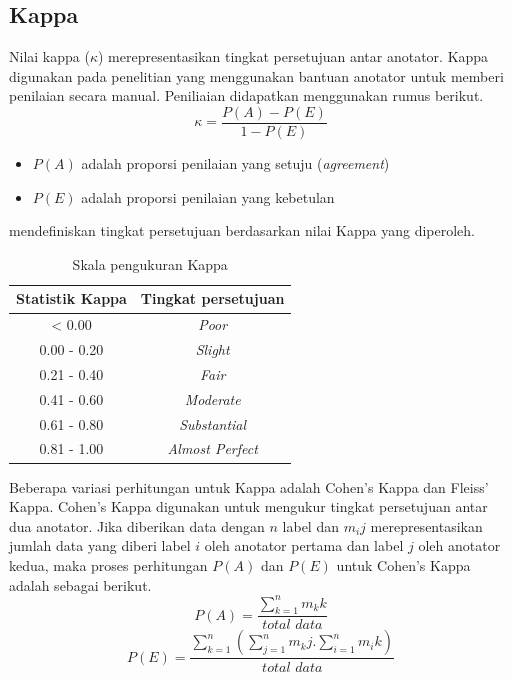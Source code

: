 \subsection{Kappa}
Nilai kappa ($\kappa$) merepresentasikan tingkat persetujuan antar anotator. Kappa digunakan pada penelitian yang menggunakan bantuan anotator untuk memberi penilaian secara manual. Peniliaian didapatkan menggunakan rumus berikut.
\[ \kappa=\frac{P(A)-P(E)}{1-P(E)} \]
\begin{itemize}
  \item $P(A)$ adalah proporsi penilaian yang setuju (\textit{agreement})
  \item $P(E)$ adalah proporsi penilaian yang kebetulan
\end{itemize}
\cite{landis1977measurement} mendefiniskan tingkat persetujuan berdasarkan nilai Kappa yang diperoleh. 
\begin{table}
  \centering
    \caption{Skala pengukuran Kappa}
    \label{table:skalaKappa}
    \begin{tabular}{|c|c|}
      \hline
      Statistik Kappa & Tingkat persetujuan \\ \hline
      < 0.00 & \textit{Poor} \\ \hline
      0.00 - 0.20 & \textit{Slight} \\ \hline
      0.21 - 0.40 & \textit{Fair} \\ \hline
      0.41 - 0.60 & \textit{Moderate} \\ \hline
      0.61 - 0.80 & \textit{Substantial} \\ \hline
      0.81 - 1.00 & \textit{Almost Perfect} \\ \hline
    \end{tabular}
\end{table}

Beberapa variasi perhitungan untuk Kappa adalah Cohen's Kappa dan Fleiss' Kappa. Cohen's Kappa digunakan untuk mengukur tingkat persetujuan antar dua anotator. Jika diberikan data dengan $n$ label dan $m_ij$ merepresentasikan jumlah data yang diberi label $i$ oleh anotator pertama dan label $j$ oleh anotator kedua, maka proses perhitungan $P(A)$ dan $P(E)$ untuk Cohen's Kappa adalah sebagai berikut.
\[ P(A)=\frac{\sum_{k=1}^{n} m_kk}{total\,\,data} \]
\[ P(E)=\frac{\sum_{k=1}^{n} ( \sum_{j=1}^{n} m_kj . \sum_{i=1}^{n} m_ik ) }{total\,\,data} \]

